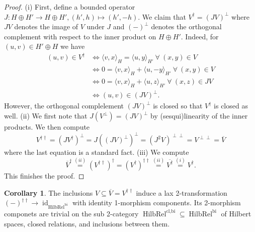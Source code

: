 \documentclass{article}
\newcommand{\id}{\operatorname{id}}%
\newcommand{\bi}{\operatorname{bi}}%
\newcommand{\HilbRel}{\operatorname{HilbRel}}%
\numberwithin{equation}{section}
\theoremstyle{definition}
\newtheorem{corollary}[definition]{Corollary}
\theoremstyle{theorem}
\begin{document}
\begin{proof}
    (i) First, define a bounded operator $J \colon H \oplus H' \to H \oplus H', (h',h) \mapsto (h',-h)$. We claim that $V^\dagger = (JV)^{\perp}$ where 
    $JV$ denotes the image of $V$ under $J$ and $(-)^{\perp}$ denotes the orthogonal complement with respect to the inner product on $H \oplus H'$. 
    Indeed, for $(u,v) \in H' \oplus H$ we have
    \begin{align*}
        (u,v) \in V^\dagger &\Leftrightarrow \langle v,x \rangle_H = \langle u, y \rangle_{H'} \ \forall \ (x,y) \in V  \\
        &\Leftrightarrow 0 = \langle v,x \rangle_H + \langle u, - y \rangle_{H'} \ \forall \ (x,y) \in V \\
        &\Leftrightarrow 0 = \langle v,x \rangle_H + \langle u, z \rangle_{H'} \ \forall \ (x,z) \in JV \\
        &\Leftrightarrow (u,v) \in (JV)^{\perp}.
    \end{align*}
    However, the orthogonal complelement $(JV)^{\perp}$ is closed so that $V^\dagger$ is closed as well. (ii) We first note that $J(V^\perp) = (JV)^{\perp}$ 
    by (sesqui)linearity of the inner products. We then compute
    \begin{equation}
        V^{\dagger \dagger} = (JV^\dagger)^{\perp} = J((JV)^{\perp})^{\perp} = (J^2V)^{\perp \perp} = V^{\perp \perp} = \overline{V}
    \end{equation}
    where the last equation is a standard fact. (iii) We compute
    \begin{equation}
        \overline{V}^{\dagger} \overset{(ii)}{=} (V^{\dagger \dagger})^\dagger = (V^{\dagger})^{\dagger \dagger} \overset{(ii)}{=} \overline{V^{\dagger}} \overset{(i)}{=} V^\dagger.
    \end{equation}
    This finishes the proof.
\end{proof}
\begin{corollary}
    The inclusions $V \subseteq \overline{V} = V^{\dagger \dagger}$ induce a lax 2-transformation $(-)^{\dagger \dagger} \to \id_{\HilbRel^{\bi}}$ 
    with identity 1-morphism components. Its 2-morphism componets are trivial on the sub 2-category $\HilbRel^{\text{cl,bi}} \subseteq \HilbRel^{\text{bi}}$ 
    of Hilbert spaces, closed relations, and inclusions between them.
\end{corollary}
\end{document}
